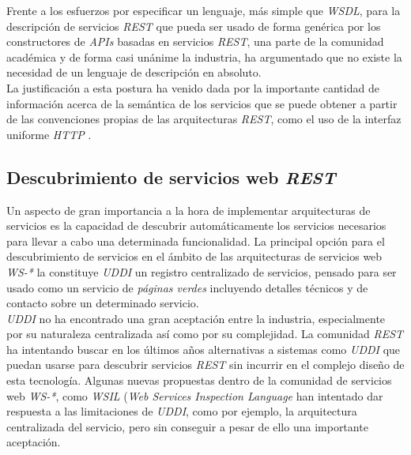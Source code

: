 Frente a los esfuerzos por especificar un lenguaje, m\'as simple que \textit{WSDL}, para la descripci\'on de servicios \textit{REST} que pueda ser usado de forma gen\'erica por los constructores de \textit{APIs} basadas en servicios \textit{REST}, una parte de la comunidad acad\'emica y de forma casi un\'anime la industria, ha argumentado que no existe la necesidad de un lenguaje de descripci\'on en absoluto.\\

La justificaci\'on a esta postura ha venido dada por la importante cantidad de informaci\'on acerca de la sem\'antica de los servicios que se puede obtener a partir de las convenciones propias de las arquitecturas \textit{REST}, como el uso de la interfaz uniforme \textit{HTTP} \cite{lanthaler2010towards}.\\

\subsection{Descubrimiento de servicios web \textit{REST}}

Un aspecto de gran importancia a la hora de implementar arquitecturas de servicios es la capacidad de descubrir autom\'aticamente los servicios necesarios para llevar a cabo una determinada funcionalidad. La principal opci\'on para el descubrimiento de servicios en el \'ambito de las arquitecturas de servicios web \textit{WS-*} la constituye \textit{UDDI} un registro centralizado de servicios, pensado para ser usado como un servicio de \textit{p\'aginas verdes} incluyendo detalles t\'ecnicos y de contacto sobre un determinado servicio.\\

\textit{UDDI} no ha encontrado una gran aceptaci\'on entre la industria, especialmente por su naturaleza centralizada as\'i como por su complejidad. La comunidad \textit{REST} ha intentando buscar en los \'ultimos a\~nos alternativas a sistemas como \textit{UDDI} que puedan usarse para descubrir servicios \textit{REST} sin incurrir en el complejo dise\~no de esta tecnolog\'ia. Algunas nuevas propuestas dentro de la comunidad de servicios web \textit{WS-*}, como \textit{WSIL} (\textit{Web Services Inspection Language} \cite{wsil} han intentado dar respuesta a las limitaciones de \textit{UDDI}, como por ejemplo, la arquitectura centralizada del servicio, pero sin conseguir a pesar de ello una importante aceptaci\'on.\\

